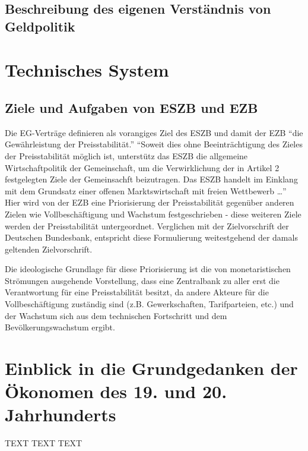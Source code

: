 \documentclass[
        onecolumn,
        a4paper,
        abstracton,
        parskip=half
        ,final
        ]{scrartcl}
\begin{document}
\subsection{Beschreibung des eigenen Verst{\"a}ndnis von Geldpolitik}

\clearpage

\section{Technisches System}
\label{sec2:technischesSystem}

\subsection{Ziele und Aufgaben von ESZB und EZB}
Die EG-Vertr{\"a}ge definieren als vorangiges Ziel des ESZB und damit der EZB "`die Gew{\"a}hrleistung der Preisstabilit{\"a}t."'
"`Soweit dies ohne Beeintr{\"a}chtigung des Zieles der Preisstabilit{\"a}t m{\"o}glich ist, unterst{\"u}tz das ESZB die allgemeine Wirtschaftpolitik der Gemeinschaft, um die Verwirklichung der in Artikel 2 festgelegten Ziele der Gemeinsachft beizutragen. Das ESZB handelt im Einklang mit dem Grundsatz einer offenen Marktswirtschaft mit freien Wettbewerb \ldots"'\citep[vgl.][S.554]{Basseler2010}
Hier wird von der EZB eine Priorisierung der Preisstabilit{\"a}t gegen{\"u}ber anderen Zielen wie Vollbesch{\"a}ftigung und Wachstum festgeschrieben - diese weiteren Ziele werden der Preisstabilit{\"a}t untergeordnet. Verglichen mit der Zielvorschrift der Deutschen Bundesbank, entspricht diese Formulierung weitestgehend der damals geltenden Zielvorschrift.\citep[vgl.][S.554]{Basseler2010}

Die ideologische Grundlage f{\"u}r diese Priorisierung ist die von monetaristischen Str{\"o}mungen ausgehende Vorstellung, dass eine Zentralbank zu aller erst die Verantwortung f{\"u}r eine Preisstabilit{\"a}t besitzt, da andere Akteure f{\"u}r die Vollbesch{\"a}ftigung zust{\"a}ndig sind (z.B. Gewerkschaften, Tarifparteien, etc.) und der Wachstum sich aus dem technischen Fortschritt und dem Bev{\"o}lkerungswachstum ergibt.

\clearpage





\section{Einblick in die Grundgedanken der {\"O}konomen des 19. und 20. Jahrhunderts}
  \label{sec3:stroemungen}
  TEXT TEXT TEXT
\end{document}

